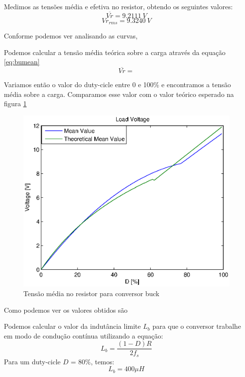 \documentclass{article}
\begin{document}
Medimos as tensões média e efetiva no resistor, obtendo os seguintes valores:
\begin{equation}
\overline{Vr} = 9.2111\ V
\end{equation}
\begin{equation}
Vr_{rms} = 9.3240\ V
\end{equation}

Conforme podemos ver analisando as curvas, %

Podemos calcular a tensão média teórica sobre a carga através da equação \ref{eq:bumean}
\begin{equation}
\overline{Vr} = 
\label{eq:bumean}
\end{equation}

Variamos então o valor do duty-cicle entre 0 e 100\% e encontramos a tensão média sobre a carga. Comparamos esse valor com o valor teórico esperado na figura \ref{fig:buvrxd}
\begin{figure}[H]
	\centering
	\includegraphics[width=0.7\linewidth]{matlab/buck/r_vrxd}
	\caption{Tensão média no resistor para conversor buck}
	\label{fig:buvrxd}
\end{figure}

Como podemos ver os valores obtidos são %

Podemos calcular o valor da indutância limite $L_b$ para que o conversor trabalhe em modo de condução contínua utilizando a equação:
\begin{equation}
	L_b = \frac{(1 - D)R}{2f_s}
\end{equation}
Para um duty-cicle $D$ = $80\%$, temos:
\begin{equation}
	L_b = 400\mu H
\end{equation}
\end{document}
